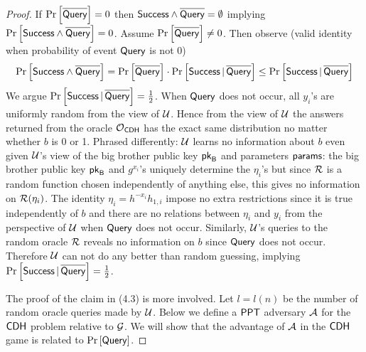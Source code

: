 \begin{proof}
If $\operatorname{Pr}\left[{\overline{\mathstrut\mathsf{Query}}}\right] = 0$ then $\mathsf{Success}\wedge\overline{\mathstrut\mathsf{Query}} = \emptyset$ implying $\operatorname{Pr}\left[{\mathsf{Success}\wedge\overline{\mathstrut\mathsf{Query}}}\right] = 0$. Assume $\operatorname{Pr}\left[{\overline{\mathstrut\mathsf{Query}}}\right] \neq 0$. Then observe (valid identity when probability of event $\mathsf{Query}$ is not 0)
\begin{align*}
	\operatorname{Pr}\left[{\mathsf{Success}\wedge\overline{\mathstrut\mathsf{Query}}}\right] = \operatorname{Pr}\left[{\overline{\mathstrut\mathsf{Query}}}\right]\cdot \operatorname{Pr}\left[\mathsf{Success}\,\vert\,\overline{\mathstrut\mathsf{Query}}\right] \leq \operatorname{Pr}\left[\mathsf{Success}\,\vert\,\overline{\mathstrut\mathsf{Query}}\right]
\end{align*}
We argue $\operatorname{Pr}\left[\mathsf{Success}\,\vert\,\overline{\mathstrut\mathsf{Query}}\right] = \frac{1}{2}$. When $\mathsf{Query}$ does not occur, all $y_i$'s are uniformly random from the view of $\mathcal{U}$. Hence from the view of $\mathcal{U}$ the answers returned from the oracle $\operatorname{\mathcal{O}}_{\mathsf{CDH}}$ has the exact same distribution no matter whether $b$ is 0 or 1. Phrased differently: $\mathcal{U}$ learns no information about $b$ even given $\mathcal{U}$'s view of the big brother public key $\mathsf{pk}_{\mathsf{B}}$ and parameters $\mathsf{params}$: the big brother public key $\mathsf{pk}_{\mathsf{B}}$ and $g^{x_i}$'s uniquely determine the $\eta_i$'s but since $\operatorname{\mathcal{R}}$ is a random function chosen independently of anything else, this gives no information on $\operatorname{\mathcal{R}}(\eta_i)$. The identity $\eta_i = h^{-x_i}h_{1,i}$ impose no extra restrictions since it is true independently of $b$ and there are no relations between $\eta_i$ and $y_i$ from the perspective of $\mathcal{U}$ when $\mathsf{Query}$ does not occur. Similarly, $\mathcal{U}$'s queries to the random oracle $\operatorname{\mathcal{R}}$ reveals no information on $b$ since $\mathsf{Query}$ does not occur. Therefore $\mathcal{U}$ can not do any better than random guessing, implying $\operatorname{Pr}\left[\mathsf{Success}\,\vert\,\overline{\mathstrut\mathsf{Query}}\right] = \frac{1}{2}$.

The proof of the claim in (4.3) is more involved. Let $l = l(n)$ be the number of random oracle queries made by $\mathcal{U}$. Below we define a $\mathsf{PPT}$ adversary $\mathcal{A}$ for the $\mathsf{CDH}$ problem relative to $\operatorname{\mathcal{G}}$. We will show that the advantage of $\mathcal{A}$ in the $\mathsf{CDH}$ game is related to $\operatorname{Pr}\left[{\mathsf{Query}}\right]$.


\end{proof}
